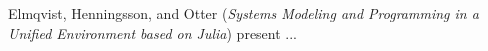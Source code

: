 

Elmqvist, Henningsson, and Otter
\cite{isola-2016-elmqvist}
({\em Systems Modeling and Programming in a
Unified Environment based on Julia})
present ...

